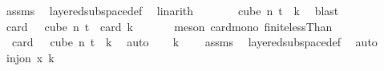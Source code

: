 \begin{isabellebody}
\ assms\ \isamarkupfalse%
\ layered{\isacharunderscore}{\kern0pt}subspace{\isacharunderscore}{\kern0pt}def\ \isamarkupfalse%
\ linarith\isanewline
\ \ \isamarkupfalse%
\ \isamarkupfalse%
\ {\isachardoublequoteopen}{\isasymchi}\ {\isacharbackquote}{\kern0pt}\ {\isacharparenleft}{\kern0pt}cube\ n\ {\isacharparenleft}{\kern0pt}t{\isacharplus}{\kern0pt}{}{\isacharparenright}{\kern0pt}{\isacharparenright}{\kern0pt}\ {\isasymsubseteq}\ {\isacharbraceleft}{\kern0pt}{\isachardot}{\kern0pt}{\isachardot}{\kern0pt}{\isacharless}{\kern0pt}k{\isacharbraceright}{\kern0pt}{\isachardoublequoteclose}\ \isamarkupfalse%
\ blast\isanewline
\ \ \isamarkupfalse%
\ \isamarkupfalse%
\ {\isachardoublequoteopen}card\ {\isacharparenleft}{\kern0pt}{\isasymchi}\ {\isacharbackquote}{\kern0pt}\ {\isacharparenleft}{\kern0pt}cube\ n\ {\isacharparenleft}{\kern0pt}t{\isacharplus}{\kern0pt}{}{\isacharparenright}{\kern0pt}{\isacharparenright}{\kern0pt}{\isacharparenright}{\kern0pt}\ {\isasymle}\ card\ {\isacharbraceleft}{\kern0pt}{\isachardot}{\kern0pt}{\isachardot}{\kern0pt}{\isacharless}{\kern0pt}k{\isacharbraceright}{\kern0pt}{\isachardoublequoteclose}\ \isanewline
\ \ \ \ \isamarkupfalse%
\ {\isacharparenleft}{\kern0pt}meson\ card{\isacharunderscore}{\kern0pt}mono\ finite{\isacharunderscore}{\kern0pt}lessThan{\isacharparenright}{\kern0pt}\isanewline
\ \ \isamarkupfalse%
\ \isamarkupfalse%
\ {\isacharasterisk}{\kern0pt}{\isacharcolon}{\kern0pt}\ {\isachardoublequoteopen}card\ {\isacharparenleft}{\kern0pt}{\isasymchi}\ {\isacharbackquote}{\kern0pt}\ {\isacharparenleft}{\kern0pt}cube\ n\ {\isacharparenleft}{\kern0pt}t{\isacharplus}{\kern0pt}{}{\isacharparenright}{\kern0pt}{\isacharparenright}{\kern0pt}{\isacharparenright}{\kern0pt}\ {\isasymle}\ k{\isachardoublequoteclose}\ \isamarkupfalse%
\ auto\isanewline
\ \ \isamarkupfalse%
\ {\isachardoublequoteopen}k\ {\isachargreater}{\kern0pt}\ {}{\isachardoublequoteclose}\ \isamarkupfalse%
\ assms{\isacharparenleft}{\kern0pt}{}{\isacharparenright}{\kern0pt}\ \isamarkupfalse%
\ layered{\isacharunderscore}{\kern0pt}subspace{\isacharunderscore}{\kern0pt}def\ \isamarkupfalse%
\ auto\isanewline
\ \ \isamarkupfalse%
\ {\isachardoublequoteopen}inj{\isacharunderscore}{\kern0pt}on\ x\ {\isacharbraceleft}{\kern0pt}{\isachardot}{\kern0pt}{\isachardot}{\kern0pt}k{\isacharbraceright}{\kern0pt}{\isachardoublequoteclose}\isanewline

\end{isabellebody}

